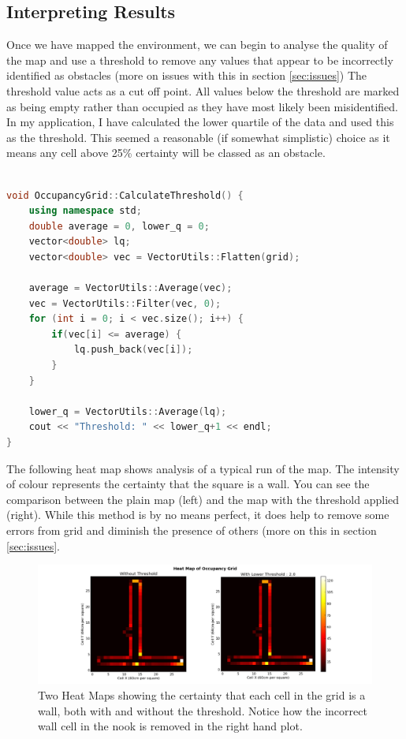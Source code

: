 \documentclass{article}
\begin{document}
\subsection{Interpreting Results}
Once we have mapped the environment, we can begin to analyse the quality of the map and use a threshold to remove any values that appear to be incorrectly identified as obstacles (more on issues with this in section \ref{sec:issues}) The threshold value acts as a cut off point. All values below the threshold are marked as being empty rather than occupied as they have most likely been misidentified. In my application, I have calculated the lower quartile of the data and used this as the threshold. This seemed a reasonable (if somewhat simplistic) choice as it means any cell above 25\% certainty will be classed as an obstacle. 

\begin{center}
	\begin{lstlisting}[language=c++, showstringspaces=false, caption={C++ code used to calculate the threshold value for the grid}]

void OccupancyGrid::CalculateThreshold() {
	using namespace std;
	double average = 0, lower_q = 0;
	vector<double> lq;
	vector<double> vec = VectorUtils::Flatten(grid);
	
	average = VectorUtils::Average(vec);
	vec = VectorUtils::Filter(vec, 0);
	for (int i = 0; i < vec.size(); i++) {
		if(vec[i] <= average) {
			lq.push_back(vec[i]);
		}
	}

	lower_q = VectorUtils::Average(lq);
	cout << "Threshold: " << lower_q+1 << endl;
}

	\end{lstlisting}
\end{center}

The following heat map shows analysis of a typical run of the map. The intensity of colour represents the certainty that the square is a wall. You can see the comparison between the plain map (left) and the map with the threshold applied (right). While this method is by no means perfect, it does help to remove some errors from grid and diminish the presence of others (more on this in section \ref{sec:issues}.
 
\begin{figure}[H]
\centering
\includegraphics[width=1.1\textwidth]{final_example.png}
\caption{Two Heat Maps showing the certainty that each cell in the grid is a wall, both with and without the threshold. Notice how the incorrect wall cell in the nook is removed in the right hand plot.}
\label{fig:final-example}
\end{figure}
\end{document}
